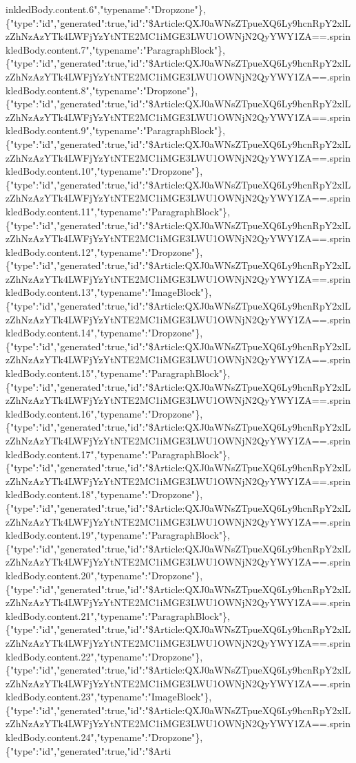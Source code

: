 inkledBody.content.6","typename":"Dropzone"\},\{"type":"id","generated":true,"id":"\$Article:QXJ0aWNsZTpueXQ6Ly9hcnRpY2xlLzZhNzAzYTk4LWFjYzYtNTE2MC1iMGE3LWU1OWNjN2QyYWY1ZA==.sprinkledBody.content.7","typename":"ParagraphBlock"\},\{"type":"id","generated":true,"id":"\$Article:QXJ0aWNsZTpueXQ6Ly9hcnRpY2xlLzZhNzAzYTk4LWFjYzYtNTE2MC1iMGE3LWU1OWNjN2QyYWY1ZA==.sprinkledBody.content.8","typename":"Dropzone"\},\{"type":"id","generated":true,"id":"\$Article:QXJ0aWNsZTpueXQ6Ly9hcnRpY2xlLzZhNzAzYTk4LWFjYzYtNTE2MC1iMGE3LWU1OWNjN2QyYWY1ZA==.sprinkledBody.content.9","typename":"ParagraphBlock"\},\{"type":"id","generated":true,"id":"\$Article:QXJ0aWNsZTpueXQ6Ly9hcnRpY2xlLzZhNzAzYTk4LWFjYzYtNTE2MC1iMGE3LWU1OWNjN2QyYWY1ZA==.sprinkledBody.content.10","typename":"Dropzone"\},\{"type":"id","generated":true,"id":"\$Article:QXJ0aWNsZTpueXQ6Ly9hcnRpY2xlLzZhNzAzYTk4LWFjYzYtNTE2MC1iMGE3LWU1OWNjN2QyYWY1ZA==.sprinkledBody.content.11","typename":"ParagraphBlock"\},\{"type":"id","generated":true,"id":"\$Article:QXJ0aWNsZTpueXQ6Ly9hcnRpY2xlLzZhNzAzYTk4LWFjYzYtNTE2MC1iMGE3LWU1OWNjN2QyYWY1ZA==.sprinkledBody.content.12","typename":"Dropzone"\},\{"type":"id","generated":true,"id":"\$Article:QXJ0aWNsZTpueXQ6Ly9hcnRpY2xlLzZhNzAzYTk4LWFjYzYtNTE2MC1iMGE3LWU1OWNjN2QyYWY1ZA==.sprinkledBody.content.13","typename":"ImageBlock"\},\{"type":"id","generated":true,"id":"\$Article:QXJ0aWNsZTpueXQ6Ly9hcnRpY2xlLzZhNzAzYTk4LWFjYzYtNTE2MC1iMGE3LWU1OWNjN2QyYWY1ZA==.sprinkledBody.content.14","typename":"Dropzone"\},\{"type":"id","generated":true,"id":"\$Article:QXJ0aWNsZTpueXQ6Ly9hcnRpY2xlLzZhNzAzYTk4LWFjYzYtNTE2MC1iMGE3LWU1OWNjN2QyYWY1ZA==.sprinkledBody.content.15","typename":"ParagraphBlock"\},\{"type":"id","generated":true,"id":"\$Article:QXJ0aWNsZTpueXQ6Ly9hcnRpY2xlLzZhNzAzYTk4LWFjYzYtNTE2MC1iMGE3LWU1OWNjN2QyYWY1ZA==.sprinkledBody.content.16","typename":"Dropzone"\},\{"type":"id","generated":true,"id":"\$Article:QXJ0aWNsZTpueXQ6Ly9hcnRpY2xlLzZhNzAzYTk4LWFjYzYtNTE2MC1iMGE3LWU1OWNjN2QyYWY1ZA==.sprinkledBody.content.17","typename":"ParagraphBlock"\},\{"type":"id","generated":true,"id":"\$Article:QXJ0aWNsZTpueXQ6Ly9hcnRpY2xlLzZhNzAzYTk4LWFjYzYtNTE2MC1iMGE3LWU1OWNjN2QyYWY1ZA==.sprinkledBody.content.18","typename":"Dropzone"\},\{"type":"id","generated":true,"id":"\$Article:QXJ0aWNsZTpueXQ6Ly9hcnRpY2xlLzZhNzAzYTk4LWFjYzYtNTE2MC1iMGE3LWU1OWNjN2QyYWY1ZA==.sprinkledBody.content.19","typename":"ParagraphBlock"\},\{"type":"id","generated":true,"id":"\$Article:QXJ0aWNsZTpueXQ6Ly9hcnRpY2xlLzZhNzAzYTk4LWFjYzYtNTE2MC1iMGE3LWU1OWNjN2QyYWY1ZA==.sprinkledBody.content.20","typename":"Dropzone"\},\{"type":"id","generated":true,"id":"\$Article:QXJ0aWNsZTpueXQ6Ly9hcnRpY2xlLzZhNzAzYTk4LWFjYzYtNTE2MC1iMGE3LWU1OWNjN2QyYWY1ZA==.sprinkledBody.content.21","typename":"ParagraphBlock"\},\{"type":"id","generated":true,"id":"\$Article:QXJ0aWNsZTpueXQ6Ly9hcnRpY2xlLzZhNzAzYTk4LWFjYzYtNTE2MC1iMGE3LWU1OWNjN2QyYWY1ZA==.sprinkledBody.content.22","typename":"Dropzone"\},\{"type":"id","generated":true,"id":"\$Article:QXJ0aWNsZTpueXQ6Ly9hcnRpY2xlLzZhNzAzYTk4LWFjYzYtNTE2MC1iMGE3LWU1OWNjN2QyYWY1ZA==.sprinkledBody.content.23","typename":"ImageBlock"\},\{"type":"id","generated":true,"id":"\$Article:QXJ0aWNsZTpueXQ6Ly9hcnRpY2xlLzZhNzAzYTk4LWFjYzYtNTE2MC1iMGE3LWU1OWNjN2QyYWY1ZA==.sprinkledBody.content.24","typename":"Dropzone"\},\{"type":"id","generated":true,"id":"\$Arti